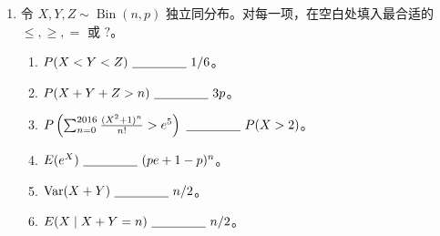 \documentclass[UTF8,12pt,a4paper,fontset=fandol]{ctexart}
\begin{document}
\begin{enumerate}
  \item 令 $X,Y,Z\sim\operatorname{Bin}(n,p)$ 独立同分布。对每一项，在空白处填入最合适的 $\le,\ge,=$ 或 $?$。
  \begin{enumerate}
    \item $P(X<Y<Z)\ \underline{\hspace{1.5cm}}\ 1/6$。
    \item $P(X+Y+Z>n)\ \underline{\hspace{1.5cm}}\ 3p$。
    \item $P\left(\sum_{n=0}^{2016}\frac{(X^2+1)^n}{n!}>e^5\right)\ \underline{\hspace{1.5cm}}\ P(X>2)$。
    \item $E(e^X)\ \underline{\hspace{1.5cm}}\ (pe+1-p)^n$。
    \item $\operatorname{Var}(X+Y)\ \underline{\hspace{1.5cm}}\ n/2$。
    \item $E(X\mid X+Y=n)\ \underline{\hspace{1.5cm}}\ n/2$。
  \end{enumerate}
\end{enumerate}
\end{document}
